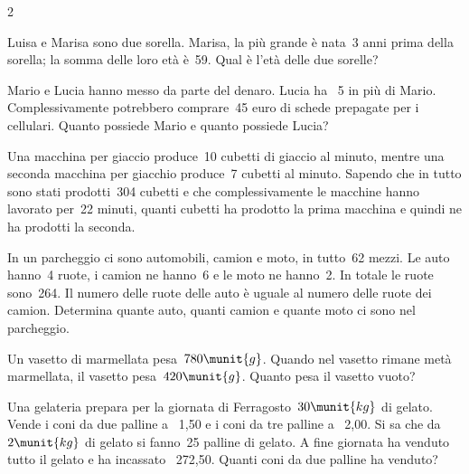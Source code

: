 \begin{htmulticols}{2}
\begin{esercizio}
 \label{ese:22.97}
Luisa e Marisa sono due sorella. Marisa, la più grande è nata~3 anni
prima della sorella; la somma delle loro età è~59. Qual è
l'età delle due sorelle?
\end{esercizio}

\begin{esercizio}
 \label{ese:22.98}
Mario e Lucia hanno messo da parte del denaro. Lucia ha {\officialeuro}~5
in più di Mario. Complessivamente potrebbero comprare~45 euro di
schede prepagate per i cellulari. Quanto possiede Mario e quanto
possiede Lucia?
\end{esercizio}

\begin{esercizio}
 \label{ese:22.99}
Una macchina per giaccio produce~10 cubetti di giaccio al minuto, mentre
una seconda macchina per giacchio produce~7 cubetti al minuto. Sapendo
che in tutto sono stati prodotti~304 cubetti e che complessivamente le
macchine hanno lavorato per~22 minuti, quanti cubetti ha prodotto la
prima macchina e quindi ne ha prodotti la seconda.
\end{esercizio}

\begin{esercizio}[*]
 \label{ese:22.100}
In un parcheggio ci sono automobili, camion e moto, in tutto~62 mezzi.
Le auto hanno~4 ruote, i camion ne hanno~6 e le moto ne hanno~2.
In totale le ruote sono~264. Il numero delle ruote delle auto è uguale
al numero delle ruote dei camion. Determina quante auto, quanti camion
e quante moto ci sono nel parcheggio.
\end{esercizio}

\begin{esercizio}
 \label{ese:22.101}
Un vasetto di marmellata pesa~\(780\munit{g}\). 
Quando nel vasetto rimane metà marmellata, 
il vasetto pesa~\(420\munit{g}\). 
Quanto pesa il vasetto vuoto?
\end{esercizio}


\begin{esercizio}[*]
 \label{ese:22.102}
Una gelateria prepara per la giornata di Ferragosto~\(30\munit{kg}\) di
gelato. Vende i coni da due palline a {\officialeuro}~1,50 e i coni da tre
palline a {\officialeuro}~2,00. Si sa che da~\(2\munit{kg}\) di gelato si 
fanno~25
palline di gelato. A fine giornata ha venduto tutto il gelato e ha
incassato {\officialeuro}~272,50. Quanti coni da due palline ha venduto?
\end{esercizio}


\end{htmulticols}
